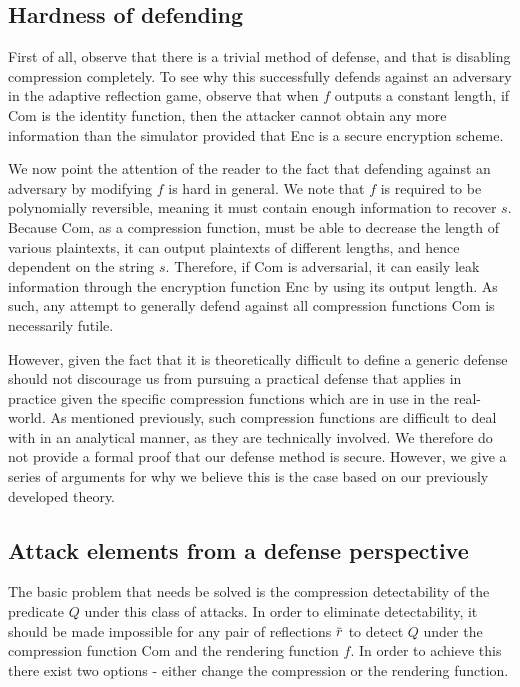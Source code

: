 \documentclass[conference, letterpaper, 10pt]{IEEEtran}
\newcommand{\overbar}[1]{\mkern 1.5mu\overline{\mkern-1.5mu#1\mkern-1.5mu}\mkern 1.5mu}
\begin{document}
\subsection{Hardness of defending}
First of all, observe that there is a trivial method of defense, and that is
disabling compression completely. To see why this successfully defends against
an adversary in the adaptive reflection game, observe that when $f$ outputs a
constant length, if Com is the identity function, then the attacker cannot
obtain any more information than the simulator provided that Enc is a secure
encryption scheme.

We now point the attention of the reader to the fact that defending against an
adversary by modifying $f$ is hard in general. We note that $f$ is required to
be polynomially reversible, meaning it must contain enough information to
recover $s$. Because Com, as a compression function, must be able to decrease
the length of various plaintexts, it can output plaintexts of different
lengths, and hence dependent on the string $s$. Therefore, if Com is
adversarial, it can easily leak information through the encryption function Enc
by using its output length. As such, any attempt to generally defend against
all compression functions Com is necessarily futile.

However, given the fact that it is theoretically difficult to define a generic
defense should not discourage us from pursuing a practical defense that applies
in practice given the specific compression functions which are in use in the
real-world. As mentioned previously, such compression functions are difficult
to deal with in an analytical manner, as they are technically involved. We
therefore do not provide a formal proof that our defense method is secure.
However, we give a series of arguments for why we believe this is the case
based on our previously developed theory.

\subsection{Attack elements from a defense perspective}
The basic problem that needs be solved is the compression detectability of
the predicate $Q$ under this class of attacks. In order to eliminate detectability,
it should be made impossible for any pair of reflections $\overbar{r}$ to detect
$Q$ under the compression function $\textrm{Com}$ and the rendering function $f$. In order to
achieve this there exist two options - either change the compression or the
rendering function.
\end{document}
